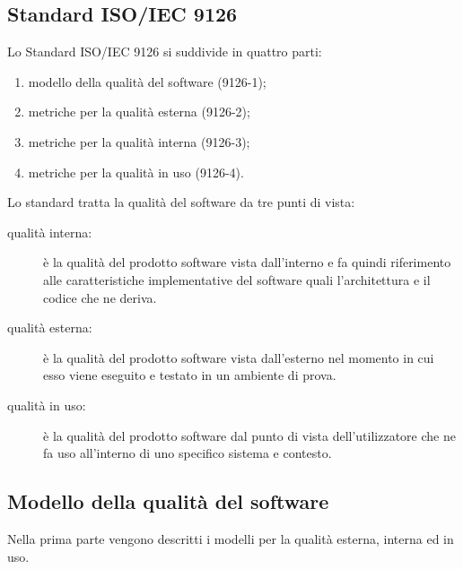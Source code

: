 \documentclass[../PianoDiQualifica.tex]{subfiles}
\begin{document}
\begin{appendices}

\section{Standard ISO/IEC 9126}
	Lo Standard ISO/IEC 9126 si suddivide in quattro parti:
		\begin{enumerate}
			\item modello della qualità del software (9126-1);
			\item metriche per la qualità esterna (9126-2);
			\item metriche per la qualità interna (9126-3);
			\item metriche per la qualità in uso (9126-4).
		\end{enumerate}
	Lo standard tratta la qualità del software da tre punti di vista:
	\begin{description}
		\item[qualità interna:] è la qualità del prodotto software vista dall'interno e fa quindi riferimento alle caratteristiche implementative del software quali l'architettura e il codice che ne deriva.
		\item[qualità esterna:] è la qualità del prodotto software vista dall'esterno nel momento in cui esso viene eseguito e testato in un ambiente di prova.
		\item[qualità in uso:] è la qualità del prodotto software dal punto di vista dell'utilizzatore che ne fa uso all'interno di uno specifico sistema e contesto.
	\end{description}
	
	\subsection{Modello della qualità del software} 
	Nella prima parte vengono descritti i modelli per la qualità esterna, interna ed in uso.

\end{appendices}
\end{document}
